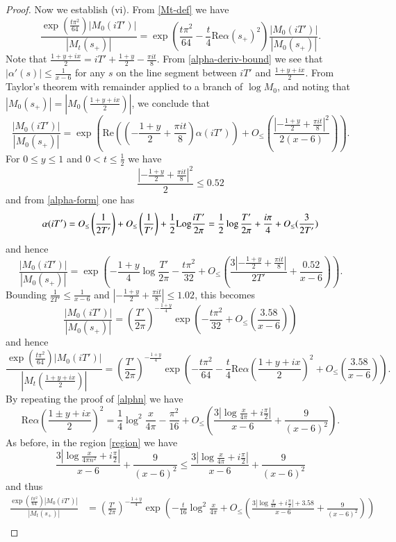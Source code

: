 \begin{proof}
Now we establish (vi).  From \eqref{Mt-def} we have
$$\frac{\exp\left( \frac{t \pi^2}{64}\right) |M_0(iT')|}{|M_t(s_+)|}
= \exp\left( \frac{t \pi^2}{64} - \frac{t}{4} \mathrm{Re} \alpha(s_+)^2\right) \frac{|M_0(iT')|}{|M_0(s_+)|}.$$
Note that $\frac{1+y+ix}{2} = iT' + \frac{1+y}{2} - \frac{\pi i t}{8}$.  From \eqref{alpha-deriv-bound} we see that $|\alpha'(s)| \leq \frac{1}{x-6}$ for any $s$ on the line segment between $iT'$ and $\frac{1+y+ix}{2}$.  From Taylor's theorem with remainder applied to a branch of $\log M_0$, and noting that $|M_0(s_+)| = |M_0(\frac{1+y+ix}{2})|$, we conclude that
$$ \frac{|M_0(iT')|}{|M_0(s_+)|} = \exp\left( \mathrm{Re}\left( \left(-\frac{1+y}{2}+\frac{\pi i t}{8}\right) \alpha(iT') \right) + O_{\leq}\left( \frac{|-\frac{1+y}{2}+\frac{\pi i t}{8}|^2}{2(x-6)} \right) \right).$$
For $0 \leq y \leq 1$ and $0 < t \leq \frac{1}{2}$ we have
$$\frac{|-\frac{1+y}{2}+\frac{\pi i t}{8}|^2}{2} \leq 0.52$$
and from \eqref{alpha-form} one has
$$ \alpha(iT') = O_{\leq}\left(\frac{1}{2T'}\right) +  O_{\leq}\left(\frac{1}{T'}\right) + \frac{1}{2} {\operatorname{Log}} \frac{iT'}{2\pi} = \frac{1}{2} \log \frac{T'}{2\pi} + \frac{i\pi}{4} + O_{\leq}( \frac{3}{2T'} ) $$
and hence
$$
\frac{|M_0(iT')|}{|M_0(s_+)|}
= \exp\left( -\frac{1+y}{4} \log \frac{T'}{2\pi} - \frac{t\pi^2}{32} + O_{\leq}\left( \frac{3|-\frac{1+y}{2}+\frac{\pi i t}{8}|}{2T'} + \frac{0.52}{x-6} \right) \right).$$
Bounding $\frac{1}{2T'} \leq \frac{1}{x-6}$ and $|-\frac{1+y}{2}+\frac{\pi i t}{8}| \leq 1.02$, this becomes
$$
\frac{|M_0(iT')|}{|M_0(s_+)|}
= \left(\frac{T'}{2\pi}\right)^{-\frac{1+y}{4}} \exp\left( - \frac{t\pi^2}{32} + O_{\leq}\left( \frac{3.58}{x-6} \right) \right)$$
and hence
$$\frac{\exp\left( \frac{t \pi^2}{64}\right) |M_0(iT')|}{|M_t(\frac{1+y+ix}{2})|} 
= \left(\frac{T'}{2\pi}\right)^{-\frac{1+y}{4}} \exp\left( - \frac{t \pi^2}{64} - \frac{t}{4} \mathrm{Re} \alpha\left(\frac{1+y+ix}{2}\right)^2 + O_{\leq}\left( \frac{3.58}{x-6} \right) \right).$$
By repeating the proof of \eqref{alphn} we have
$$
\mathrm{Re} \alpha(\frac{1 \pm y + ix}{2})^2 = \frac{1}{4} \log^2 \frac{x}{4\pi} - \frac{\pi^2}{16} + 
O_{\leq}\left( \frac{3 |\log \frac{x}{4\pi} + i \frac{\pi}{2}|}{x-6} + \frac{9}{(x-6)^2}\right).
$$
As before, in the region \eqref{region} we have
$$\frac{3 |\log \frac{x}{4\pi n^2} + i \frac{\pi}{2}|}{x-6} + \frac{9}{(x-6)^2} \leq \frac{3 |\log \frac{x}{4\pi} + i \frac{\pi}{2}|}{x-6} + \frac{9}{(x-6)^2}
$$
and thus
\begin{align*}
\frac{\exp\left( \frac{t \pi^2}{64}\right) |M_0(iT')|}{|M_t(s_+)|}
&= \left(\frac{T'}{2\pi}\right)^{-\frac{1+y}{4}} \exp\left( - \frac{t}{16} \log^2 \frac{x}{4\pi} + O_{\leq}\left( \frac{3 |\log \frac{x}{4\pi} + i \frac{\pi}{2}|+3.58}{x-6} + \frac{9}{(x-6)^2} \right) \right)\\

\end{align*}
\end{proof}
